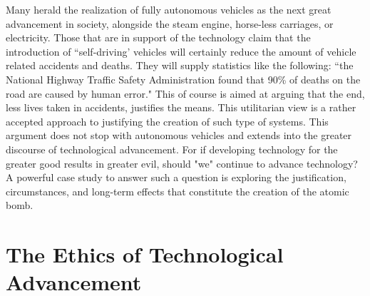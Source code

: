 \documentclass[10pt]{article}
\begin{document}
Many herald the realization of fully autonomous vehicles as the next great advancement in society, alongside the steam engine, horse-less carriages, or electricity. Those that are in support of the technology claim that the introduction of ``self-driving' vehicles will certainly reduce the amount of vehicle related accidents and deaths. They will supply statistics like the following: ``the National Highway Traffic Safety Administration found that 90\% of deaths on the road are caused by human error."\textsuperscript{\cite{Singh2015}} This of course is aimed at arguing that the end, less lives taken in accidents, justifies the means. This utilitarian view is a rather accepted approach to justifying the creation of such type of systems. This argument does not stop with autonomous vehicles and extends into the greater discourse of technological advancement. For if developing technology for the greater good results in greater evil, should "we" continue to advance technology? A powerful case study to answer such a question is exploring the justification, circumstances, and long-term effects that constitute the creation of the atomic bomb.

\section{The Ethics of Technological Advancement}
\end{document}
